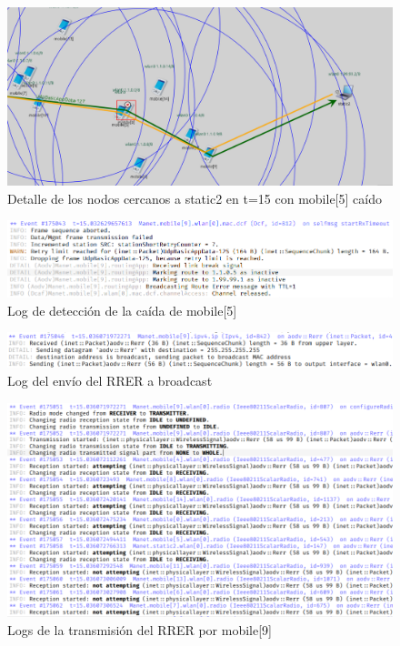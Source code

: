 \begin{figure}[H]
    \centering
    \includegraphics[width=125mm, scale=0.75]{imaxes/ejercicio4_2.png}
    \caption{Detalle de los nodos cercanos a static2 en t=15 con mobile[5] caído}
    \label{fig:nodocaidot15}
\end{figure}

\begin{figure}[H]
    \centering
    \includegraphics[width=125mm, scale=0.75]{imaxes/ejercicio4_3.png}
    \caption{Log de detección de la caída de mobile[5]}
    \label{fig:deteccioncaida}
\end{figure}

\begin{figure}[H]
    \centering
    \includegraphics[width=125mm, scale=0.75]{imaxes/ejercicio4_4.png}
    \caption{Log del envío del RRER a broadcast}
    \label{fig:caidabroadcast}
\end{figure}

\begin{figure}[H]
    \centering
    \includegraphics[width=125mm, scale=0.75]{imaxes/ejercicio4_5.png}
    \caption{Logs de la transmisión del RRER por mobile[9]}
    \label{fig:transmisioncaida}
\end{figure}

